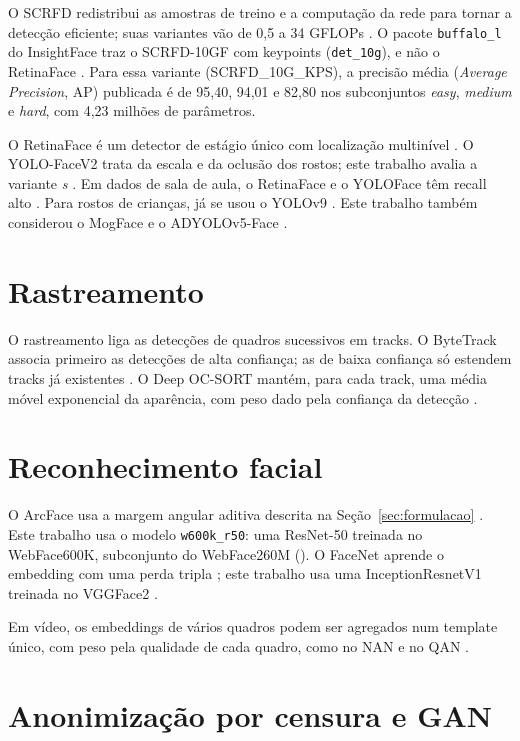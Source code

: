 O SCRFD redistribui as amostras de treino e a computação da rede para tornar a detecção eficiente; suas variantes vão de 0,5 a 34 GFLOPs \citep{scrfd}.
O pacote \texttt{buffalo\_l} do InsightFace traz o SCRFD-10GF com keypoints (\texttt{det\_10g}), e não o RetinaFace \citep{insightface}.
Para essa variante (SCRFD\_10G\_KPS), a precisão média (\emph{Average Precision}, AP) publicada é de 95,40, 94,01 e 82,80 nos subconjuntos \emph{easy}, \emph{medium} e \emph{hard}, com 4,23 milhões de parâmetros.

O RetinaFace é um detector de estágio único com localização multinível \citep{retinaface}.
O YOLO-FaceV2 trata da escala e da oclusão dos rostos; este trabalho avalia a variante \emph{s} \citep{yolofacev2}.
Em dados de sala de aula, o RetinaFace e o YOLOFace têm recall alto \citep{gf-ananda}.
Para rostos de crianças, já se usou o YOLOv9 \citep{ahmed}.
Este trabalho também considerou o MogFace \citep{mogface} e o ADYOLOv5-Face \citep{adyolov5face}.

\section{Rastreamento}

O rastreamento liga as detecções de quadros sucessivos em tracks.
O ByteTrack associa primeiro as detecções de alta confiança; as de baixa confiança só estendem tracks já existentes \citep{bytetrack}.
O Deep OC-SORT mantém, para cada track, uma média móvel exponencial da aparência, com peso dado pela confiança da detecção \citep{deepocsort}.

\section{Reconhecimento facial}

O ArcFace usa a margem angular aditiva descrita na Seção~\ref{sec:formulacao} \citep{arcface}.
Este trabalho usa o modelo \texttt{w600k\_r50}: uma ResNet-50 treinada no WebFace600K, subconjunto do WebFace260M (\citealp{webface260m}).
O FaceNet aprende o embedding com uma perda tripla \citep{facenet}; este trabalho usa uma InceptionResnetV1 treinada no VGGFace2 \citep{vggface2,facenetpytorch}.

Em vídeo, os embeddings de vários quadros podem ser agregados num template único, com peso pela qualidade de cada quadro, como no NAN \citep{nan} e no QAN \citep{qan}.

\section{Anonimização por censura e GAN}

